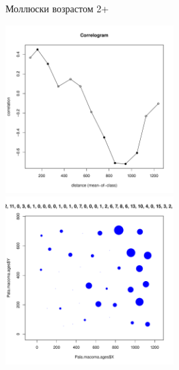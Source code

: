 \begin{figure}[h]
	\begin{minipage}[b]{\linewidth}
	\begin{center}
		Моллюски возрастом 2+
	\end{center}
	\end{minipage}

	\begin{minipage}[b]{.46\linewidth}
	\begin{center}
		\includegraphics[width=65mm]{../Barenc_Sea/distribution_Moran/Pala_macoma_age_N2_.pdf}
	\end{center}
	\end{minipage}
%
	\hfil %
%
	\begin{minipage}[b]{.46\linewidth}
	\begin{center}
		\includegraphics[width=65mm]{../Barenc_Sea/distribution_Moran/Pala_macoma_age_bubb_N2_.pdf}
	\end{center}
	\end{minipage}

	\end{figure}





